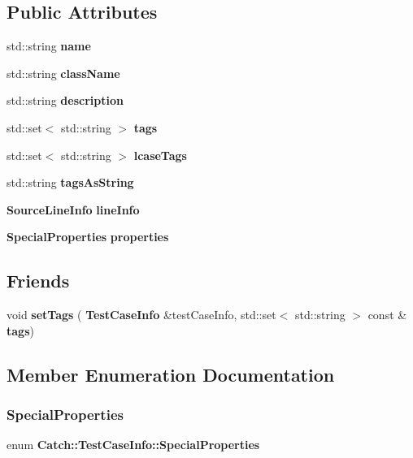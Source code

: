 \subsection*{Public Attributes}
\begin{DoxyCompactItemize}
\item 
std\+::string \textbf{ name}
\item 
std\+::string \textbf{ class\+Name}
\item 
std\+::string \textbf{ description}
\item 
std\+::set$<$ std\+::string $>$ \textbf{ tags}
\item 
std\+::set$<$ std\+::string $>$ \textbf{ lcase\+Tags}
\item 
std\+::string \textbf{ tags\+As\+String}
\item 
\textbf{ Source\+Line\+Info} \textbf{ line\+Info}
\item 
\textbf{ Special\+Properties} \textbf{ properties}
\end{DoxyCompactItemize}
\subsection*{Friends}
\begin{DoxyCompactItemize}
\item 
void \textbf{ set\+Tags} (\textbf{ Test\+Case\+Info} \&test\+Case\+Info, std\+::set$<$ std\+::string $>$ const \&\textbf{ tags})
\end{DoxyCompactItemize}


\subsection{Member Enumeration Documentation}
\mbox{\label{struct_catch_1_1_test_case_info_a39b232f74b4a7a6f2183b96759027eac}} 
\subsubsection{Special\+Properties}
{\footnotesize\ttfamily enum \textbf{ Catch\+::\+Test\+Case\+Info\+::\+Special\+Properties}}

